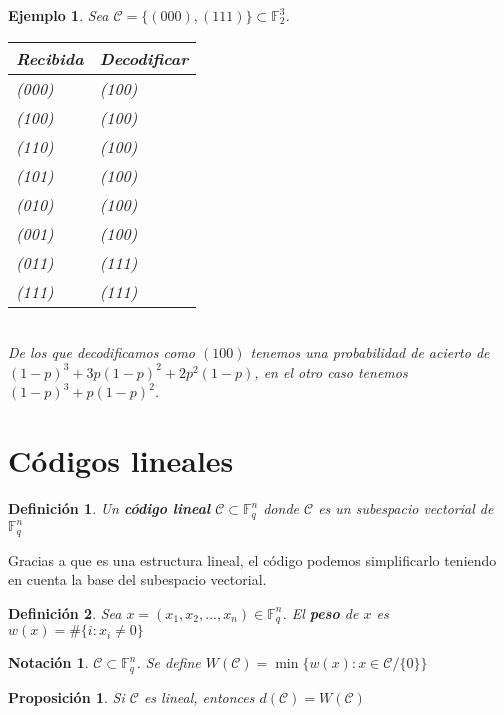 \documentclass[spanish]{book}
\newtheorem{mydef}{Definición}
\newtheorem{nota}{Notación}
\newtheorem{ejem}{Ejemplo}
\newtheorem{proposi}{Proposición}
\begin{document}
\begin{ejem}
	Sea $\mathcal{C}=\{(000), (111)\} \subset \mathbb{F}_2^3$. \\
	\begin{table}[h]
		\begin{center}
			\begin{tabular}{|l|l|}
				\hline
				Recibida & Decodificar \\
				\hline \hline
				(000) & (100)\\
				\hline 
				(100) & (100)\\
				\hline 
				(110) & (100)\\
				\hline 
				(101) & (100) \\
				\hline 
				(010) & (100)\\
				\hline
				(001) & (100)\\
				\hline 
				(011) & (111) \\
				\hline
				(111) & (111)
				\\
				\hline
				
			\end{tabular}
		\end{center}
	\end{table}
	\\
	De los que decodificamos como $(100)$ tenemos una probabilidad de acierto de $(1-p)^3+3p(1-p)^2+2p^2(1-p)$, en el otro caso tenemos $(1-p)^3+p(1-p)^2$.
\end{ejem}

\section{Códigos lineales}
\begin{mydef}
	Un \textbf{código lineal} $\mathcal{C} \subset \mathbb{F}_q^n$ donde $\mathcal{C}$ es un subespacio vectorial de $\mathbb{F}_q^n$
\end{mydef}
Gracias a que es una estructura lineal, el código podemos simplificarlo teniendo en cuenta la base del subespacio vectorial.
\begin{mydef}
	Sea $x=(x_1, x_2, ..., x_n) \in \mathbb{F}_q^n$. El \textbf{peso} de $x$ es $w(x)=\#\{i : x_i \neq 0\}$
\end{mydef}
\begin{nota}
	$\mathcal{C} \subset \mathbb{F}_q^n$. Se define $W(\mathcal{C})=\min \{w(x) : x \in \mathcal{C} / \{0\}\}$
\end{nota}

\newpage
\begin{proposi}
	Si $\mathcal{C}$ es lineal, entonces $d(\mathcal{C})=W(\mathcal{C})$
\end{proposi}
\end{document}
